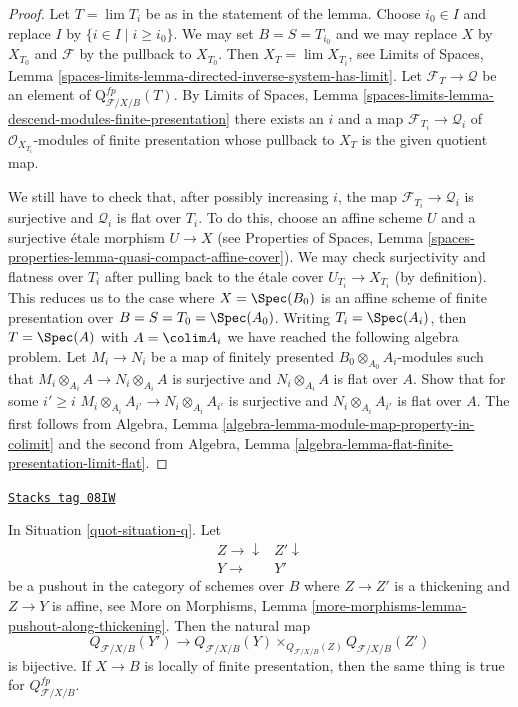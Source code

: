 \begin{proof}
Let $T = \lim T_i$ be as in the statement of the lemma.
Choose $i_0 \in I$ and replace $I$ by $\{i \in I \mid i \geq i_0\}$.
We may set $B = S = T_{i_0}$ and we may replace $X$ by $X_{T_0}$
and $\mathcal{F}$ by the pullback to $X_{T_0}$. Then
$X_T = \lim X_{T_i}$, see
Limits of Spaces, Lemma
\ref{spaces-limits-lemma-directed-inverse-system-has-limit}.
Let $\mathcal{F}_T \to \mathcal{Q}$ be an element of
$\text{Q}^{fp}_{\mathcal{F}/X/B}(T)$. By
Limits of Spaces, Lemma
\ref{spaces-limits-lemma-descend-modules-finite-presentation}
there exists an $i$ and a map $\mathcal{F}_{T_i} \to \mathcal{Q}_i$
of $\mathcal{O}_{X_{T_i}}$-modules of finite presentation whose
pullback to $X_T$ is the given quotient map.

\medskip\noindent
We still have to check that, after possibly increasing $i$, the map
$\mathcal{F}_{T_i} \to \mathcal{Q}_i$ is surjective and $\mathcal{Q}_i$
is flat over $T_i$. To do this, choose an affine scheme $U$ and a
surjective \'etale morphism $U \to X$ (see Properties of Spaces,
Lemma \ref{spaces-properties-lemma-quasi-compact-affine-cover}).
We may check surjectivity and flatness over $T_i$ after pulling
back to the \'etale cover $U_{T_i} \to X_{T_i}$ (by definition).
This reduces us to the case where $X = \Spec(B_0)$ is an affine scheme of
finite presentation over $B = S = T_0 = \Spec(A_0)$.
Writing $T_i = \Spec(A_i)$, then $T = \Spec(A)$ with $A = \colim A_i$
we have reached the following algebra problem. Let $M_i \to N_i$
be a map of finitely presented $B_0 \otimes_{A_0} A_i$-modules
such that $M_i \otimes_{A_i} A \to N_i \otimes_{A_i} A$ is surjective
and $N_i \otimes_{A_i} A$ is flat over $A$. Show that for some $i' \geq i$
$M_i \otimes_{A_i} A_{i'} \to N_i \otimes_{A_i} A_{i'}$ is surjective
and $N_i \otimes_{A_i} A_{i'}$ is flat over $A$.
The first follows from
Algebra, Lemma \ref{algebra-lemma-module-map-property-in-colimit}
and the second from
Algebra, Lemma \ref{algebra-lemma-flat-finite-presentation-limit-flat}.
\end{proof}

\begin{lemma}[Q RS star]
\label{quot-lemma-q-RS-star}
\href{https://stacks.math.columbia.edu/tag/08IW}{\texttt{Stacks tag 08IW}}

In Situation \ref{quot-situation-q}. Let
$$
\begin{array}{cc}Z \longrightarrow\downarrow & Z' \downarrow \\ Y \longrightarrow & Y'\end{array}
$$
be a pushout in the category of schemes over $B$ where
$Z \to Z'$ is a thickening and $Z \to Y$ is affine, see
More on Morphisms, Lemma \ref{more-morphisms-lemma-pushout-along-thickening}.
Then the natural map
$$
Q_{\mathcal{F}/X/B}(Y') \longrightarrow
Q_{\mathcal{F}/X/B}(Y) \times_{Q_{\mathcal{F}/X/B}(Z)} Q_{\mathcal{F}/X/B}(Z')
$$
is bijective. If $X \to B$ is locally of finite presentation, then
the same thing is true for $Q^{fp}_{\mathcal{F}/X/B}$.
\end{lemma}

